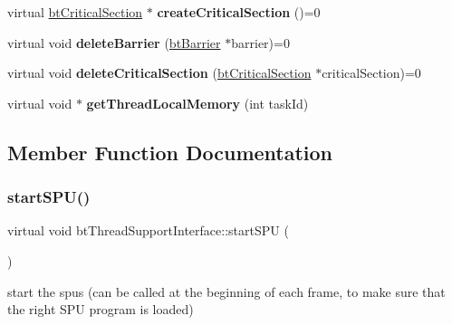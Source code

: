 \begin{DoxyCompactItemize}
\item 
\mbox{\label{classbtThreadSupportInterface_a503dbd240c46fdf8a2c7bfe396f2e92d}} 
virtual \hyperlink{classbtCriticalSection}{bt\+Critical\+Section} $\ast$ {\bfseries create\+Critical\+Section} ()=0
\item 
\mbox{\label{classbtThreadSupportInterface_abea87baf684bbf17d55491712b49007a}} 
virtual void {\bfseries delete\+Barrier} (\hyperlink{classbtBarrier}{bt\+Barrier} $\ast$barrier)=0
\item 
\mbox{\label{classbtThreadSupportInterface_abfacf16e211a97d4f52a14330133e780}} 
virtual void {\bfseries delete\+Critical\+Section} (\hyperlink{classbtCriticalSection}{bt\+Critical\+Section} $\ast$critical\+Section)=0
\item 
\mbox{\label{classbtThreadSupportInterface_a9870ef95be61b71ddef44640b9bf4a15}} 
virtual void $\ast$ {\bfseries get\+Thread\+Local\+Memory} (int task\+Id)
\end{DoxyCompactItemize}


\subsection{Member Function Documentation}
\mbox{\label{classbtThreadSupportInterface_a4d5139ae58302c0509c309ba9f3d2ca3}} 
\subsubsection{\texorpdfstring{start\+S\+P\+U()}{startSPU()}\hspace{0.1cm}{\footnotesize\ttfamily [1/2]}}
{\footnotesize\ttfamily virtual void bt\+Thread\+Support\+Interface\+::start\+S\+PU (\begin{DoxyParamCaption}{ }\end{DoxyParamCaption})\hspace{0.3cm}{\ttfamily [pure virtual]}}



start the spus (can be called at the beginning of each frame, to make sure that the right S\+PU program is loaded) 

